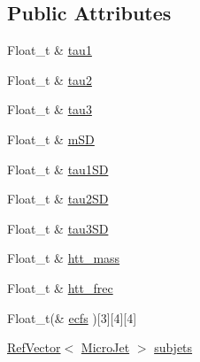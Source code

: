 \subsection*{Public Attributes}
\begin{DoxyCompactItemize}
\item 
Float\_\-t \& \hyperlink{classpanda_1_1FatJet_aa6746a89ca7d85ba576e0dd3a50d9254}{tau1}
\item 
Float\_\-t \& \hyperlink{classpanda_1_1FatJet_ac66ad6c1ad774b8ed4ae3ac2059fee31}{tau2}
\item 
Float\_\-t \& \hyperlink{classpanda_1_1FatJet_a0d1f8250b2e71beda36cd248550ff6cf}{tau3}
\item 
Float\_\-t \& \hyperlink{classpanda_1_1FatJet_a7c462ec73f49ac541b4597d3942236a7}{mSD}
\item 
Float\_\-t \& \hyperlink{classpanda_1_1FatJet_aa7b7e69b9382e5762895173d11c78426}{tau1SD}
\item 
Float\_\-t \& \hyperlink{classpanda_1_1FatJet_a4e2222a027fb5afc507570ed9844358a}{tau2SD}
\item 
Float\_\-t \& \hyperlink{classpanda_1_1FatJet_a611cd125d9a3584ca036b9284540ef4a}{tau3SD}
\item 
Float\_\-t \& \hyperlink{classpanda_1_1FatJet_aeb5265d526d4d970f2c49d98f8e5f418}{htt\_\-mass}
\item 
Float\_\-t \& \hyperlink{classpanda_1_1FatJet_a9237481670015ed3793e4729fd337662}{htt\_\-frec}
\item 
Float\_\-t(\& \hyperlink{classpanda_1_1FatJet_ab4fca3ce4af63d1b8ef1a450ec945668}{ecfs} )\mbox{[}3\mbox{]}\mbox{[}4\mbox{]}\mbox{[}4\mbox{]}
\item 
\hyperlink{classpanda_1_1RefVector}{RefVector}$<$ \hyperlink{classpanda_1_1MicroJet}{MicroJet} $>$ \hyperlink{classpanda_1_1FatJet_af34aeaf274c73856e950a21450dec129}{subjets}
\end{DoxyCompactItemize}
